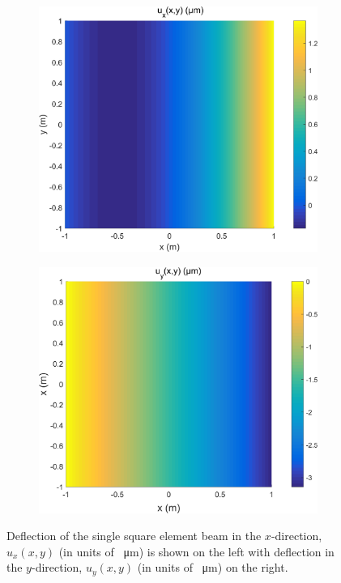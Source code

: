 \documentclass[11pt]{article}
\begin{document}
\begin{figure}[!htb]
	\centering
	\begin{subfigure}{.5\textwidth}
		\centering
		\includegraphics[width=\linewidth]{q2a_surf_ux.png}
	\end{subfigure}%
	\begin{subfigure}{.5\textwidth}
		\centering
		\includegraphics[width=\linewidth]{q2a_surf_uy.png}
	\end{subfigure}
	\caption{Deflection of the single square element beam in the $x$-direction, $u_x(x,y)$ (in units of \SI{}{\micro\m}) is shown on the left with deflection in the $y$-direction, $u_y(x,y)$ (in units of \SI{}{\micro\m}) on the right.}
	\label{fig:q2a_ux_uy}
\end{figure}
\end{document}
